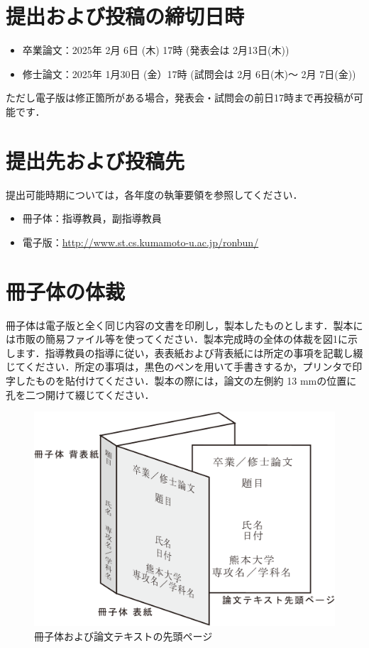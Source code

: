 \documentclass{kupaper}
\begin{document}
\chapter{提出および投稿の締切日時}
\begin{itemize}
	\item 卒業論文：2025年 2月 6日 (木) 17時 (発表会は 2月13日(木))
	\item 修士論文：2025年 1月30日 (金）17時 (試問会は 2月 6日(木)～ 2月 7日(金))
\end{itemize}
ただし電子版は修正箇所がある場合，発表会・試問会の前日17時まで再投稿が可能です．

\chapter{提出先および投稿先}
提出可能時期については，各年度の執筆要領を参照してください．
\begin{itemize}
	\item 冊子体：指導教員，副指導教員
	\item 電子版：\url{http://www.st.cs.kumamoto-u.ac.jp/ronbun/} 
\end{itemize}

\chapter{冊子体の体裁}



冊子体は電子版と全く同じ内容の文書を印刷し，製本したものとします．製本には市販の簡易ファイル等を使ってください．製本完成時の全体の体裁を図1に示します．指導教員の指導に従い，表表紙および背表紙には所定の事項を記載し綴じてください．所定の事項は，黒色のペンを用いて手書きするか，プリンタで印字したものを貼付けてください．製本の際には，論文の左側約 13 mmの位置に孔を二つ開けて綴じてください．

\begin{figure}[htbp]
	\centering
	\includegraphics[width=1.0\linewidth,keepaspectratio]{book.pdf}
	\caption{冊子体および論文テキストの先頭ページ}
	\label{overview}
\end{figure}
\end{document}
